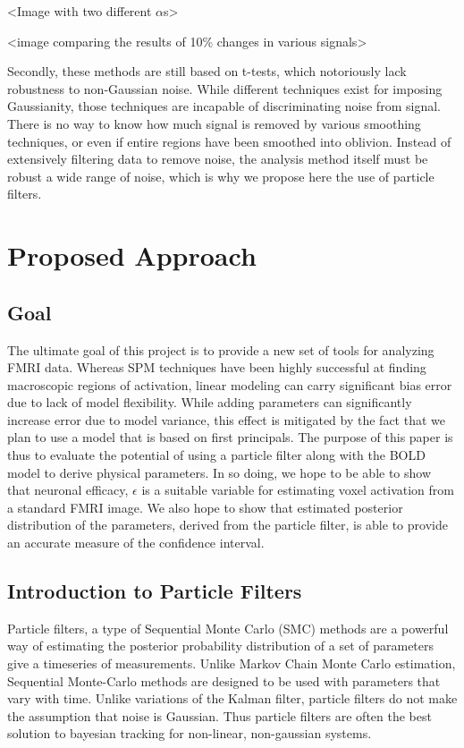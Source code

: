 \documentclass{article}
\begin{document}
<Image with two different $\alpha$s>

<image comparing the results of 10\% changes in various signals>

Secondly, these methods are still based on t-tests, which notoriously
lack robustness to non-Gaussian noise. While different techniques 
exist for imposing Gaussianity, those techniques are incapable of
discriminating noise from signal. There is no way to know how much 
signal is removed by various smoothing techniques, or even if entire 
regions have been smoothed into oblivion. Instead of extensively filtering data to 
remove noise, the analysis method itself must be robust a wide range of noise,
which is why we propose here the use of particle filters.

\section{Proposed Approach}
\subsection{Goal}
The ultimate goal of this project is to provide a new set of tools
for analyzing FMRI data. Whereas SPM techniques have been highly 
successful at finding macroscopic regions of activation, linear 
modeling can carry significant bias error due to lack of model
flexibility. While adding parameters can significantly increase
error due to model variance, this effect is mitigated by the fact
that we plan to use a model that is based on first principals. The
purpose of this paper is thus to evaluate the potential of using
a particle filter along with the BOLD model to derive physical 
parameters. In so doing, we hope to be able to show that neuronal
efficacy, $\epsilon$ is a suitable variable for estimating voxel 
activation from a standard FMRI image. We also hope to show that 
estimated posterior distribution of the parameters, derived from
the particle filter, is able to provide an accurate measure of the
confidence interval.

\subsection{Introduction to Particle Filters}
Particle filters, a type of Sequential Monte Carlo (SMC) methods
are a powerful way of estimating the posterior probability distribution
of a set of parameters give a timeseries of measurements. Unlike Markov 
Chain Monte Carlo estimation, Sequential Monte-Carlo methods are designed
to be used with parameters that vary with time. Unlike variations of the
Kalman filter, particle filters do not make the assumption that noise
is Gaussian. Thus particle filters are often the best solution to bayesian 
tracking for non-linear, non-gaussian systems. 
\end{document}

